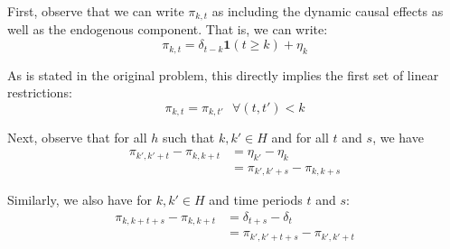 \documentclass[11pt]{article}
\begin{document}
\begin{enumerate}[1)]
\begin{enumerate}[(a)]
		First, observe that we can write $\pi_{k,t}$ as including the dynamic causal effects as well as the endogenous component. That is, we can write:
		\[\pi_{k,t} = \delta_{t-k}\mathbf{1}(t \geq k) + \eta_k \]

		As is stated in the original problem, this directly implies the first set of linear restrictions:
		\[\pi_{k,t} = \pi_{k,t'} \mbox{ } \forall (t,t') < k\]

		Next, observe that for all $h$ such that $k, k' \in H$ and for all $t$ and $s$, we have
		\begin{align*}
			\pi_{k',k'+t} - \pi_{k,k+t} & = \eta_{k'} - \eta_{k} \\
			& = \pi_{k',k'+s} - \pi_{k,k+s}
		\end{align*}

		Similarly, we also have for $k,k'\in H$ and time periods $t$ and $s$:
		\begin{align*}
			\pi_{k,k+t+s} - \pi_{k,k+t} & = \delta_{t+s} - \delta_{t} \\
            & = \pi_{k',k'+t+s} - \pi_{k',k'+t}
		\end{align*}
	\end{enumerate}
\end{enumerate}
\end{document}
